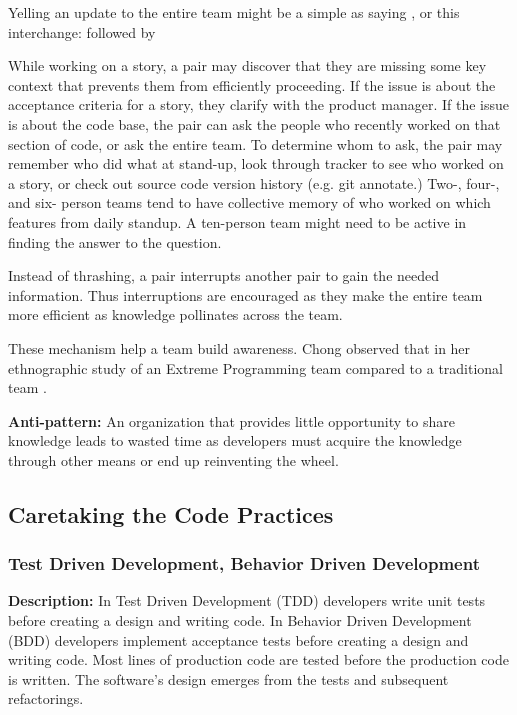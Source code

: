 \begin{table}[]
Yelling an update to the entire team might be a simple as saying , or this interchange:   followed by 

While working on a story, a pair may discover that they are missing some key context that prevents them from efficiently proceeding. If the issue is about the acceptance criteria for a story, they clarify with the product manager. If the issue is about the code base, the pair can ask the people who recently worked on that section of code, or ask the entire team.  To determine whom to ask, the pair may remember who did what at stand-up, look through tracker to see who worked on a story, or check out source code version history (e.g. git annotate.) Two-, four-, and six- person teams tend to have collective memory of who worked on which features from daily standup. A ten-person team might need to be active in finding the answer to the question. 

Instead of thrashing, a pair interrupts another pair to gain the needed information. Thus interruptions are encouraged as they make the entire team more efficient as knowledge pollinates across the team. 

These mechanism help a team build awareness. Chong observed that  in her ethnographic study of an Extreme Programming team compared to a traditional team \cite{ChongNominum}.
 
\textbf{Anti-pattern:} An organization that provides little opportunity to share knowledge leads to wasted time as developers must acquire the knowledge through other means or end up reinventing the wheel.
\subsection{Caretaking the Code Practices}
\subsubsection{Test Driven Development, Behavior Driven Development}
\textbf{Description:} In Test Driven Development (TDD) developers write unit tests before creating a design and writing code. In Behavior Driven Development (BDD) developers implement acceptance tests before creating a design and writing code.  Most lines of production code are tested before the production code is written. The software's design emerges from the tests and subsequent refactorings.


\end{table}
